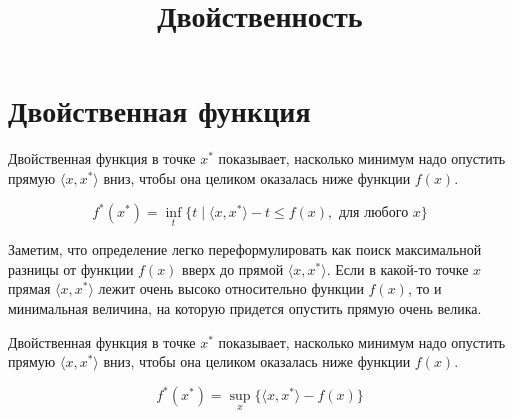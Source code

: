 \documentclass[
  letterpaper,
  DIV=11,
  numbers=noendperiod]{scrartcl}
\title{Двойственность}
\author{}
\date{}
\renewcommand*\contentsname{Содержание}
\newcommand\contentsname{Содержание}
\begin{document}
\maketitle

\renewcommand*\contentsname{Содержание}
{
\hypersetup{linkcolor=}
\setcounter{tocdepth}{2}
\tableofcontents
}
\section{Двойственная
функция}\label{ux434ux432ux43eux439ux441ux442ux432ux435ux43dux43dux430ux44f-ux444ux443ux43dux43aux446ux438ux44f}

\begin{tcolorbox}[enhanced jigsaw, coltitle=black, colback=white, opacitybacktitle=0.6, colframe=quarto-callout-note-color-frame, titlerule=0mm, leftrule=.75mm, bottomrule=.15mm, opacityback=0, toptitle=1mm, bottomtitle=1mm, arc=.35mm, colbacktitle=quarto-callout-note-color!10!white, title=\textcolor{quarto-callout-note-color}{\faInfo}\hspace{0.5em}{Двойственная функция}, rightrule=.15mm, breakable, toprule=.15mm, left=2mm]

Двойственная функция в точке \(x^*\) показывает, насколько минимум надо
опустить прямую \(\langle x, x^* \rangle\) вниз, чтобы она целиком
оказалась ниже функции \(f(x)\).

\[
f^*(x^*) = \inf_t \{t \mid \langle x, x^* \rangle - t \leq f(x), \text{ для любого } x\}
\]

\end{tcolorbox}

Заметим, что определение легко переформулировать как поиск максимальной
разницы от функции \(f(x)\) вверх до прямой \(\langle x, x^* \rangle\).
Если в какой-то точке \(x\) прямая \(\langle x, x^* \rangle\) лежит
очень высоко относительно функции \(f(x)\), то и минимальная величина,
на которую придется опустить прямую очень велика.

\begin{tcolorbox}[enhanced jigsaw, coltitle=black, colback=white, opacitybacktitle=0.6, colframe=quarto-callout-note-color-frame, titlerule=0mm, leftrule=.75mm, bottomrule=.15mm, opacityback=0, toptitle=1mm, bottomtitle=1mm, arc=.35mm, colbacktitle=quarto-callout-note-color!10!white, title=\textcolor{quarto-callout-note-color}{\faInfo}\hspace{0.5em}{Двойственная функция}, rightrule=.15mm, breakable, toprule=.15mm, left=2mm]

Двойственная функция в точке \(x^*\) показывает, насколько минимум надо
опустить прямую \(\langle x, x^* \rangle\) вниз, чтобы она целиком
оказалась ниже функции \(f(x)\).

\[
f^*(x^*) = \sup_x \{\langle x, x^* \rangle - f(x)\}
\]

\end{tcolorbox}
\end{document}
